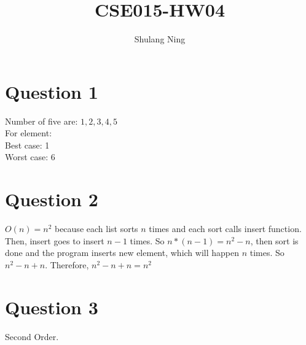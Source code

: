 \documentclass[11pt]{article}
\title{CSE015-HW04}
\author{Shulang Ning}
\newcommand\tab[1][1cm]{\hspace*{#1}}
\begin{document}
        
    \maketitle
    
    \section{Question 1}
        Number of five are: $1, 2, 3, 4, 5$\\
        For element:\\
        \tab Best case: 1\\
        \tab Worst case: 6\\

    \section{Question 2}
    $O(n) = n^2$ because each list sorts $n$ times and each sort calls insert function. Then, insert goes to insert $n - 1$ times. So $n * (n - 1) = n^2 - n$, then sort is done and the program inserts new element, which will happen $n$ times. So $n^2 - n + n$. Therefore, $n^2 - n + n = n^2$\\

    \section{Question 3}
    Second Order.\\
\end{document}
